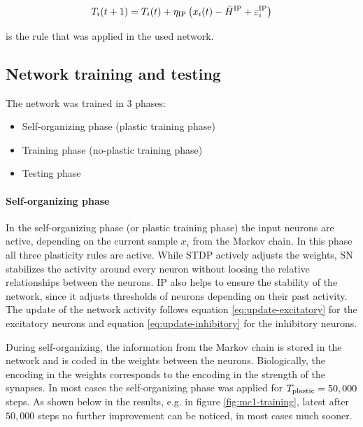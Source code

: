\begin{equation}
\label{eq:hip-ind}
T_i(t+1) = T_i(t) + \eta_{\text{IP}} \left( x_i(t) - \bar H^{\text{IP}} + \varepsilon_i^{\text{IP}} \right)
\end{equation}


is the rule that was applied in the used network.

\subsection{Network training and testing}
\label{sec:train}

The network was trained in 3 phases:

\begin{itemize}
\item Self-organizing phase (plastic training phase)
\item Training phase (no-plastic training phase)
\item Testing phase
\end{itemize}

\paragraph{Self-organizing phase}

In the self-organizing phase (or plastic training phase) the input neurons are active, depending on the current sample $x_i$ from the Markov chain. In this phase all three plasticity rules are active. While STDP actively adjusts the weights, SN stabilizes the activity around every neuron without loosing the relative relationships between the neurons. IP also helps to ensure the stability of the network, since it adjusts thresholds of neurons depending on their past activity. The update of the network activity follows equation \eqref{eq:update-excitatory} for the excitatory neurons and equation \eqref{eq:update-inhibitory} for the inhibitory neurons.

During self-organizing, the information from the Markov chain is stored in the network and is coded in the weights between the neurons. Biologically, the encoding in the weights corresponds to the encoding in the strength of the synapses. In most cases the self-organizing phase was applied for $T_{\text{plastic}} = 50,000$ steps. As shown below in the results, e.g. in figure \ref{fig:mc1-training}, latest after $50,000$ steps no further improvement can be noticed, in most cases much sooner.

